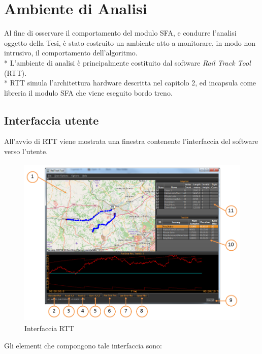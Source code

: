 \chapter{Ambiente di Analisi}
Al fine di osservare il comportamento del modulo SFA, e condurre l'analisi oggetto della Tesi, \`e stato costruito un ambiente atto a monitorare, in modo non intrusivo, il comportamento dell'algoritmo.\\*
L'ambiente di analisi \`e principalmente costituito dal software \emph{Rail Track Tool} (RTT).\\*
RTT simula l'architettura hardware descritta nel capitolo 2, ed incapsula come libreria il modulo SFA che viene eseguito bordo treno.
\section{Interfaccia utente}
All'avvio di RTT viene mostrata una finestra contenente l'interfaccia del software verso l'utente.
\begin{figure}[h]
	\centering
	\includegraphics[height=8.2cm]{img/rtthci}
	\caption{Interfaccia RTT}
	\label{fig:rtt}
\end{figure}\newpage
Gli elementi che compongono tale interfaccia sono:
